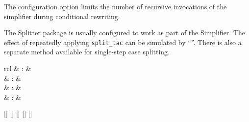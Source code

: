 \begin{isabellebody}
\begin{isamarkuptext}
  The configuration option  limits the number of
  recursive invocations of the simplifier during conditional
  rewriting.

  \medskip The Splitter package is usually configured to work as part
  of the Simplifier.  The effect of repeatedly applying \verb|split_tac| can be simulated by ``''.  There is also a separate 
  method available for single-step case splitting.%
\end{isamarkuptext}%
\isamarkuptrue%
%
\isamarkuptrue%
%
\begin{isamarkuptext}%
\begin{matharray}{rcl}
    \hypertarget{command.print-simpset}{\hyperlink{command.print-simpset}{\mbox{}}} & : &  \\
    \hypertarget{attribute.simp}{\hyperlink{attribute.simp}{\mbox{}}} & : &  \\
    \hypertarget{attribute.cong}{\hyperlink{attribute.cong}{\mbox{}}} & : &  \\
    \hypertarget{attribute.split}{\hyperlink{attribute.split}{\mbox{}}} & : &  \\
  \end{matharray}

  \begin{railoutput}
\rail@bar
{}[]
[]
[]
\rail@endbar
\rail@bar
{}
[]
[]
\rail@endbar
\rail@end
\end{railoutput}



\end{isamarkuptext}
\end{isabellebody}
